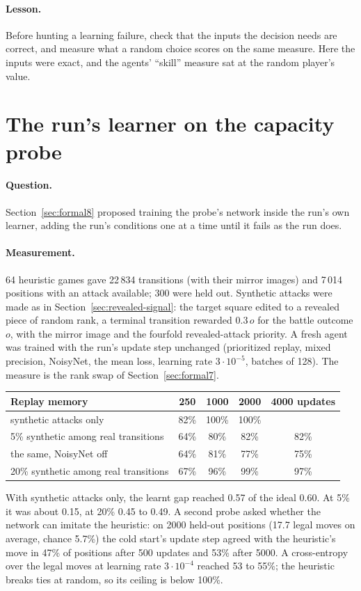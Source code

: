 \paragraph{Lesson.} Before hunting a learning failure, check that the inputs the decision needs
are correct, and measure what a random choice scores on the same measure. Here the inputs were
exact, and the agents' ``skill'' measure sat at the random player's value.

\section{The run's learner on the capacity probe}
\label{sec:ladder}

\paragraph{Question.} Section~\ref{sec:formal8} proposed training the probe's network inside the
run's own learner, adding the run's conditions one at a time until it fails as the run does.

\paragraph{Measurement.} 64 heuristic games gave 22\,834 transitions (with their mirror images)
and 7\,014 positions with an attack available; 300 were held out. Synthetic attacks were made as in
Section~\ref{sec:revealed-signal}: the target square edited to a revealed piece of random rank,
a terminal transition rewarded $0.3\,o$ for the battle outcome $o$, with the mirror image and the
fourfold revealed-attack priority. A fresh agent was trained with the run's update step
unchanged (prioritized replay, mixed precision, NoisyNet, the mean loss, learning rate
$3\cdot10^{-5}$, batches of 128). The measure is the rank swap of Section~\ref{sec:formal7}.
\begin{center}
\small
\begin{tabular}{lcccc}
\toprule
Replay memory & 250 & 1000 & 2000 & 4000 updates \\
\midrule
synthetic attacks only & 82\% & 100\% & 100\% & \\
5\% synthetic among real transitions & 64\% & 80\% & 82\% & 82\% \\
\quad the same, NoisyNet off & 64\% & 81\% & 77\% & 75\% \\
20\% synthetic among real transitions & 67\% & 96\% & 99\% & 97\% \\
\bottomrule
\end{tabular}
\end{center}
With synthetic attacks only, the learnt gap reached 0.57 of the ideal 0.60. At 5\% it was about
0.15, at 20\% 0.45 to 0.49. A second probe asked whether the network can imitate the heuristic: on
2000 held-out positions (17.7 legal moves on average, chance 5.7\%) the cold start's update step
agreed with the heuristic's move in 47\% of positions after 500 updates and 53\% after 5000. A
cross-entropy over the legal moves at learning rate $3\cdot10^{-4}$ reached 53 to 55\%; the
heuristic breaks ties at random, so its ceiling is below 100\%.

